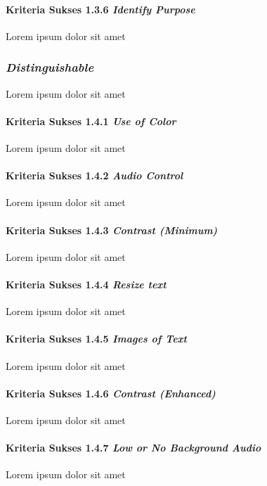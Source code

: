 \paragraph{Kriteria Sukses 1.3.6 \textit{Identify Purpose}}
\label{sec:kriteria_sukses_1.3.6}
Lorem ipsum dolor sit amet

\subsubsection{\textit{Distinguishable}}
\label{sec:distinguishable}
Lorem ipsum dolor sit amet

\paragraph{Kriteria Sukses 1.4.1 \textit{Use of Color}}
\label{sec:kriteria_sukses_1.4.1}
Lorem ipsum dolor sit amet

\paragraph{Kriteria Sukses 1.4.2 \textit{Audio Control}}
\label{sec:kriteria_sukses_1.4.2}
Lorem ipsum dolor sit amet

\paragraph{Kriteria Sukses 1.4.3 \textit{Contrast (Minimum)}}
\label{sec:kriteria_sukses_1.4.3}
Lorem ipsum dolor sit amet

\paragraph{Kriteria Sukses 1.4.4 \textit{Resize text}}
\label{sec:kriteria_sukses_1.4.4}
Lorem ipsum dolor sit amet

\paragraph{Kriteria Sukses 1.4.5 \textit{Images of Text}}
\label{sec:kriteria_sukses_1.4.5}
Lorem ipsum dolor sit amet

\paragraph{Kriteria Sukses 1.4.6 \textit{Contrast (Enhanced)}}
\label{sec:kriteria_sukses_1.4.6}
Lorem ipsum dolor sit amet

\paragraph{Kriteria Sukses 1.4.7 \textit{Low or No Background Audio}}
\label{sec:kriteria_sukses_1.4.7}
Lorem ipsum dolor sit amet

